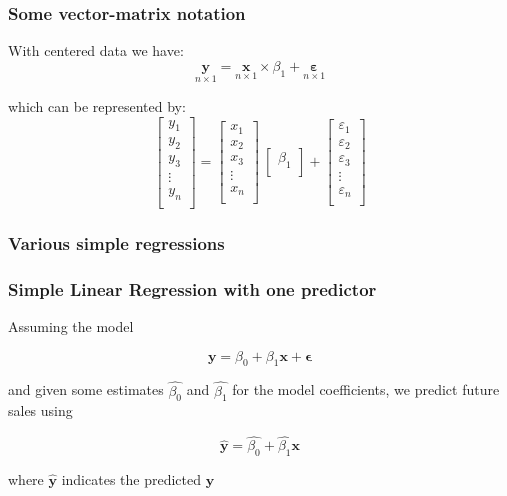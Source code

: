 \documentclass[12pt]{beamer}\usepackage[]{graphicx}\usepackage[]{color}
\begin{document}
\begin{frame}
\frametitle{Some vector-matrix notation}

With centered data we have:
$$
\underset{n\times 1}{\mathbf{y}} =  \underset{n \times 1}{\mathbf{x}} \times 
\beta_1 + \underset{n\times 1}{\boldsymbol{\varepsilon}}
$$

which can be represented by:
$$
\begin{bmatrix} 
y_1 \\
y_2 \\
y_3 \\
\vdots \\
y_n \\
\end{bmatrix}
=
\begin{bmatrix} 
x_{1} \\
x_{2} \\
x_{3} \\
\vdots \\
x_{n} \\
\end{bmatrix}
\
\begin{bmatrix} 
\beta_1 \\
\end{bmatrix}
+
\begin{bmatrix} 
\varepsilon_1 \\
\varepsilon_2 \\
\varepsilon_3 \\
\vdots \\
\varepsilon_n \\
\end{bmatrix}
$$

\end{frame}


\begin{frame}
\frametitle{Various simple regressions}
\begin{center}
\end{center}
\end{frame}


\begin{frame}
\frametitle{Simple Linear Regression with one predictor}

Assuming the model

$$
\mathbf{y} = \beta_0 + \beta_1 \mathbf{x} + \boldsymbol{\epsilon}
$$

and given some estimates $\hat{\beta_0}$ and $\hat{\beta_1}$ for the model 
coefficients, we predict future sales using

$$
\mathbf{\hat{y}} = \hat{\beta_0} + \hat{\beta_1} \mathbf{x}
$$

where $\mathbf{\hat{y}}$ indicates the predicted $\mathbf{y}$

\end{frame}
\end{document}

